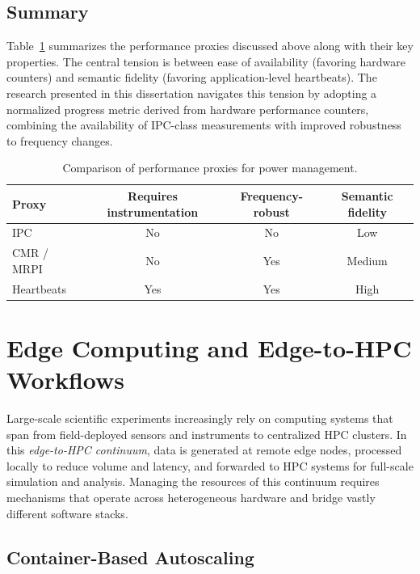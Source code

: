 \subsection{Summary}

Table~\ref{tab:litrev_proxies} summarizes the performance proxies discussed
above along with their key properties.  The central tension is between
ease of availability (favoring hardware counters) and semantic fidelity
(favoring application-level heartbeats).  The research presented in this
dissertation navigates this tension by adopting a normalized progress metric
derived from hardware performance counters, combining the availability of
IPC-class measurements with improved robustness to frequency changes.

\begin{table}[t]
  \centering
  \caption{Comparison of performance proxies for power management.}
  \label{tab:litrev_proxies}
  \begin{tabular}{lccc}
    \toprule
    \textbf{Proxy} & \textbf{Requires instrumentation} & \textbf{Frequency-robust} & \textbf{Semantic fidelity} \\
    \midrule
    IPC                & No  & No  & Low  \\
    CMR / MRPI         & No  & Yes & Medium \\
    Heartbeats         & Yes & Yes & High \\
    \bottomrule
  \end{tabular}
\end{table}

\section{Edge Computing and Edge-to-HPC Workflows}

Large-scale scientific experiments increasingly rely on computing systems that span
from field-deployed sensors and instruments to centralized HPC clusters.
In this \emph{edge-to-HPC continuum}, data is generated at remote edge nodes,
processed locally to reduce volume and latency, and forwarded to HPC systems for
full-scale simulation and analysis.
Managing the resources of this continuum requires mechanisms that operate across
heterogeneous hardware and bridge vastly different software stacks.

\subsection{Container-Based Autoscaling}

